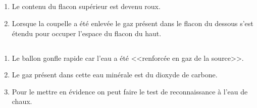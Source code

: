 \subsection*{}
\begin{enumerate}[label=\alph*)]
	\item Le contenu du flacon supérieur est devenu roux.
	\item Lorsque la coupelle a été enlevée le gaz présent dans le flacon du dessous s'est étendu pour occuper l'espace du flacon du haut.
\end{enumerate}

\subsection*{}
\begin{enumerate}[label=\alph*)]
	\item Le ballon gonfle rapide car l'eau a été <<renforcée en gaz de la source>>.
	\item Le gaz présent dans cette eau minérale est du dioxyde de carbone.
	\item Pour le mettre en évidence on peut faire le test de reconnaissance à l'eau de chaux.
\end{enumerate}